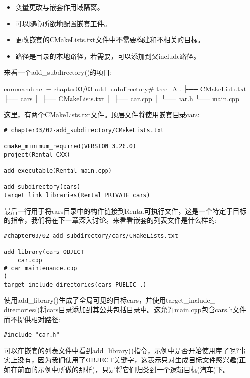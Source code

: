 \begin{itemize}
\item 
变量更改与嵌套作用域隔离。

\item 
可以随心所欲地配置嵌套工件。

\item 
更改嵌套的CMakeLists.txt文件中不需要构建和不相关的目标。

\item 
路径是目录的本地路径，若需要，可以添加到父include路径。
\end{itemize}

来看一个add\_subdirectory()的项目:

\begin{tcblisting}{commandshell={}}
chapter03/03-add_subdirectory# tree -A
.
├── CMakeLists.txt
├── cars
│     ├── CMakeLists.txt
│     ├── car.cpp
│     └── car.h
└── main.cpp
\end{tcblisting}

这里，有两个CMakeLists.txt文件。顶层文件将使用嵌套目录cars:

\begin{lstlisting}[style=styleCMake]
# chapter03/02-add_subdirectory/CMakeLists.txt

cmake_minimum_required(VERSION 3.20.0)
project(Rental CXX)

add_executable(Rental main.cpp)

add_subdirectory(cars)
target_link_libraries(Rental PRIVATE cars)
\end{lstlisting}

最后一行用于将cars目录中的构件链接到Rental可执行文件。这是一个特定于目标的指令，我们将在下一章深入讨论。来看看嵌套的列表文件是什么样的:

\begin{lstlisting}[style=styleCMake]
#chapter03/02-add_subdirectory/cars/CMakeLists.txt

add_library(cars OBJECT
	car.cpp
# car_maintenance.cpp
)
target_include_directories(cars PUBLIC .)
\end{lstlisting}

使用add\_library()生成了全局可见的目标cars，并使用target\_include\_ directories()将cars目录添加到其公共包括目录中。这允许main.cpp包含cars.h文件而不提供相对路径:

\begin{lstlisting}[style=styleCXX]
#include "car.h"
\end{lstlisting}

可以在嵌套的列表文件中看到add\_library()指令，示例中是否开始使用库了呢?事实上没有，因为我们使用了OBJECT关键字，这表示只对生成目标文件感兴趣(正如在前面的示例中所做的那样)，只是将它们归类到一个逻辑目标(汽车)下。

